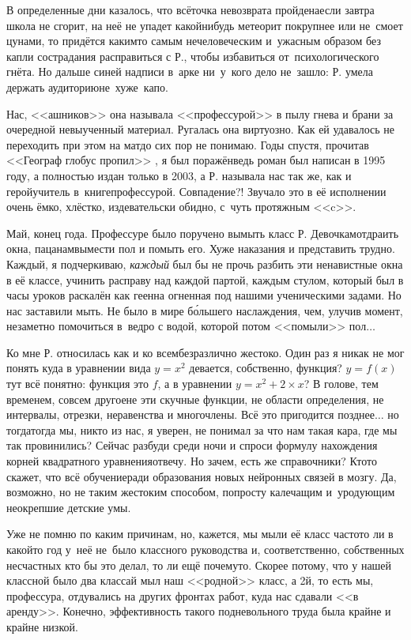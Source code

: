 В определенные дни казалось, что всё\mdash точка невозврата пройдена\mdash если завтра школа не сгорит, на неё не упадет какой\sdash нибудь метеорит покрупнее или не~смоет цунами, то придётся каким\sdash то самым нечеловеческим и~ужасным образом без капли сострадания расправиться с Р., чтобы избавиться от~психологического гнёта. Но дальше синей надписи в~арке ни~у~кого дело не~зашло: Р. умела держать аудиторию\mdash не~хуже~капо.

Нас, <<ашников>> она называла <<профессурой>> в пылу гнева и брани за очередной невыученный материал. Ругалась она виртуозно. Как ей удавалось не переходить при этом на мат\mdash до сих пор не понимаю. Годы спустя, прочитав <<Географ глобус пропил>> \cite{ГеографГлобусПропил}, я был поражён\mdash ведь роман был написан в 1995 году, а полностью издан только в 2003, а Р. называла нас так же, как и герой\sdash учитель в~книге\mdash профессурой. Совпадение?! Звучало это в её исполнении очень ёмко, хлёстко, издевательски обидно, с~чуть протяжным <<c>>.

Май, конец года. Профессуре было поручено вымыть класс Р. Девочкам\mdash отдраить окна, пацанам\mdash вымести пол и помыть его. Хуже наказания и представить трудно. Каждый, я подчеркиваю, \textit{каждый} был бы не прочь разбить эти ненавистные окна в её классе, учинить расправу над каждой партой, каждым стулом, который был в часы уроков раскалён как геенна огненная под нашими ученическими задами. Но нас заставили мыть. Не было в мире б\'{о}льшего наслаждения, чем, улучив момент, незаметно помочиться в~ведро с водой, которой потом <<помыли>> пол$\ldots$

Ко мне Р. относилась как и ко всем\mdash безразлично жестоко. Один раз я никак не мог понять куда в уравнении вида ${y=x^2}$ девается, собственно, функция? ${y=f(x)}$\mdash тут всё понятно: функция это $f$, а в уравнении ${y=x^2 + 2\times x}$? В голове, тем временем, совсем другое\mdash не эти скучные функции, не области определения, не интервалы, отрезки, неравенства и многочлены. Всё это пригодится позднее$\ldots$ но тогда\mdash тогда мы, никто из нас, я уверен, не понимал за что нам такая кара, где мы так провинились? Сейчас разбуди среди ночи и спроси формулу нахождения корней квадратного уравнения\mdash отвечу. Но зачем, есть же справочники? Кто\sdash то скажет, что всё обучение\mdash ради образования новых нейронных связей в мозгу. Да, возможно, но не таким жестоким способом, попросту калечащим и~уродующим неокрепшие детские умы. 

Уже не помню по каким причинам, но, кажется, мы мыли её класс часто\mdash то ли в какой\sdash то год у~неё не~было классного руководства и, соответственно, собственных несчастных кто бы это делал, то ли ещё почему\sdash то. Скорее потому, что у нашей классной было два класса\sdash й мыл наш <<родной>> класс, а 2\sdash й, то есть мы, профессура, отдувались на других фронтах работ, куда нас сдавали <<в аренду>>. Конечно, эффективность такого подневольного труда была крайне и крайне низкой. 

